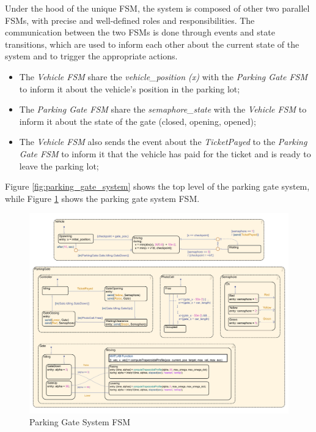 Under the hood of the unique FSM, the system is composed of other two parallel FSMs, with precise and well-defined roles and responsibilities.
The communication between the two FSMs is done through events and state transitions, which are used to inform each other about the current state of the system and to trigger the appropriate actions.

\begin{itemize}
    \item The \textit{Vehicle FSM} share the \textit{vehicle\_position (x)} with the \textit{Parking Gate FSM} to inform it about the vehicle's position in the parking lot;
    \item The \textit{Parking Gate FSM} share the \textit{semaphore\_state} with the \textit{Vehicle FSM} to inform it about the state of the gate (closed, opening, opened);
    \item The \textit{Vehicle FSM} also sends the event about the \textit{TicketPayed} to the \textit{Parking Gate FSM} to inform it that the vehicle has paid for the ticket and is ready to leave the parking lot;
\end{itemize}

Figure \ref{fig:parking_gate_system} shows the top level of the parking gate system, while Figure \ref{fig:parking_gate_system_fsm} shows the parking gate system FSM.

\begin{figure}[H]
    \centering
    \includegraphics[width=1.0\textwidth]{./img/MATLAB/FSM_parking_gate_system_overview.pdf}
    \caption{Parking Gate System FSM}
    \label{fig:parking_gate_system_fsm}
\end{figure}



